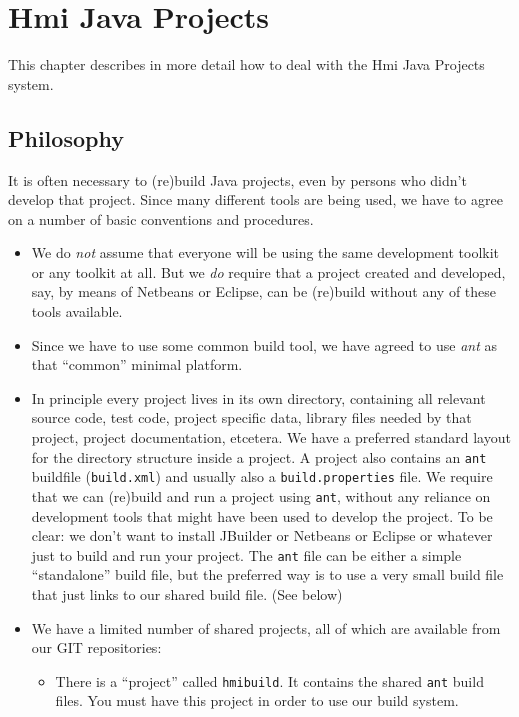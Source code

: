 

\chapter{Hmi Java Projects}\label{chapter:projectbuilding}


This chapter describes in more detail how to deal with the Hmi Java Projects system.

\section{Philosophy}
It is often  necessary to (re)build Java projects, even by persons who
didn't develop that project. Since many different tools are being used,
we have to agree on a number of basic conventions and procedures.
\begin{itemize}
\item We do \emph{not} assume that everyone will be using the same development toolkit or any toolkit at all.
But we \emph{do} require that a project created and developed, say, by means of Netbeans or Eclipse,
can be (re)build without any of these tools available.
\item Since we have to use some common build tool, we have agreed to use \emph{ant} as
that ``common'' minimal platform.

\item In principle every project lives in its own directory, containing all relevant source code, test code,
project specific data, library files needed by that project, project documentation, etcetera.
We have a preferred standard layout for the directory structure inside a project.
A project also contains an \verb#ant# buildfile (\verb#build.xml#) and usually also a \verb#build.properties# file.
We require that we can (re)build and run a project using \verb#ant#, without any reliance on development tools
that might have been used to develop the project. To be clear: we don't want to install JBuilder or Netbeans or Eclipse or whatever just to build and run your project.
The \verb#ant# file can be either a simple ``standalone'' build file, but the preferred way is to use
a very small build file that just links to our shared build file. (See below)

\item We have a limited number of shared projects, all of which are available from our GIT repositories:
\begin{itemize}
\item There is a ``project'' called \verb#hmibuild#. It contains the shared \verb#ant# build files. 
You must have this project in order to use our build system.


\end{itemize}
\end{itemize}
